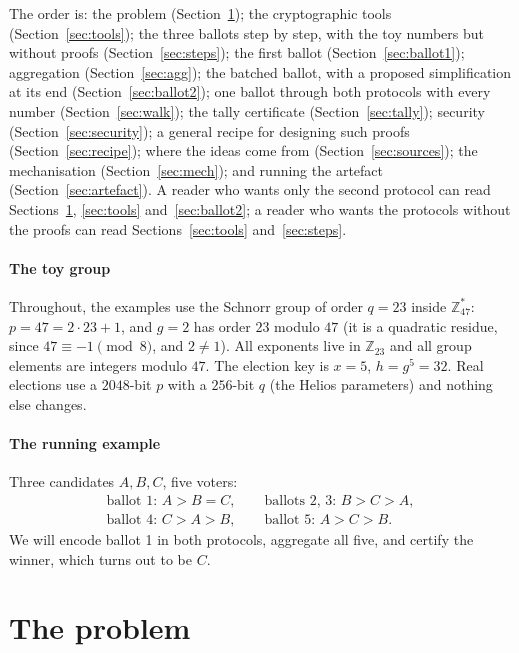 \documentclass[11pt,a4paper]{article}
\newcommand{\Z}{\mathbb{Z}}
\theoremstyle{remark}
\begin{document}
The order is: the problem (Section~\ref{sec:problem}); the cryptographic
tools (Section~\ref{sec:tools}); the three ballots step by step, with
the toy numbers but without proofs (Section~\ref{sec:steps}); the first ballot
(Section~\ref{sec:ballot1}); aggregation (Section~\ref{sec:agg}); the
batched ballot, with a proposed simplification at its end
(Section~\ref{sec:ballot2}); one ballot through both protocols with every
number (Section~\ref{sec:walk}); the tally certificate
(Section~\ref{sec:tally}); security (Section~\ref{sec:security}); a
general recipe for designing such proofs (Section~\ref{sec:recipe});
where the ideas come from (Section~\ref{sec:sources}); the mechanisation
(Section~\ref{sec:mech}); and running the artefact
(Section~\ref{sec:artefact}). A reader who wants only the second protocol
can read Sections~\ref{sec:problem}, \ref{sec:tools} and~\ref{sec:ballot2};
a reader who wants the protocols without the proofs can read
Sections~\ref{sec:tools} and~\ref{sec:steps}.

\paragraph{The toy group} Throughout, the examples use the Schnorr group of
order $q = 23$ inside $\Z_{47}^*$: $p = 47 = 2 \cdot 23 + 1$, and $g = 2$
has order $23$ modulo $47$ (it is a quadratic residue, since $47 \equiv -1
\pmod 8$, and $2 \ne 1$). All exponents live in $\Z_{23}$ and all group
elements are integers modulo $47$. The election key is $x = 5$, $h = g^5 =
32$. Real elections use a $2048$-bit $p$ with a $256$-bit $q$ (the Helios
parameters) and nothing else changes.

\paragraph{The running example} Three candidates $A, B, C$, five voters:
\begin{gather*}
  \text{ballot 1: } A > B = C,\qquad
  \text{ballots 2, 3: } B > C > A,\\
  \text{ballot 4: } C > A > B,\qquad
  \text{ballot 5: } A > C > B.
\end{gather*}
We will encode ballot 1 in both protocols, aggregate all five, and certify
the winner, which turns out to be $C$.

\section{The problem}\label{sec:problem}
\end{document}
